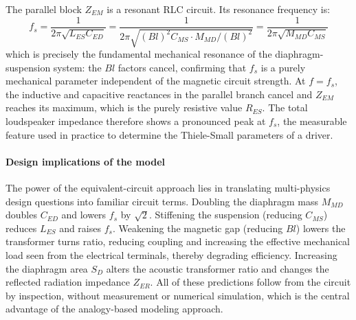 The parallel block \(Z_{EM}\) is a resonant RLC circuit. Its resonance frequency is:
\[
f_s = \frac{1}{2\pi\sqrt{L_{ES} C_{ED}}} = \frac{1}{2\pi\sqrt{(Bl)^2 C_{MS}\cdot M_{MD}/(Bl)^2}} = \frac{1}{2\pi\sqrt{M_{MD} C_{MS}}}
\]
which is precisely the fundamental mechanical resonance of the diaphragm-suspension system: the \(Bl\) factors cancel, confirming that \(f_s\) is a purely mechanical parameter independent of the magnetic circuit strength. At \(f = f_s\), the inductive and capacitive reactances in the parallel branch cancel and \(Z_{EM}\) reaches its maximum, which is the purely resistive value \(R_{ES}\). The total loudspeaker impedance therefore shows a pronounced peak at \(f_s\), the measurable feature used in practice to determine the Thiele-Small parameters of a driver.

\paragraph{Design implications of the model} The power of the equivalent-circuit approach lies in translating multi-physics design questions into familiar circuit terms. Doubling the diaphragm mass \(M_{MD}\) doubles \(C_{ED}\) and lowers \(f_s\) by \(\sqrt{2}\). Stiffening the suspension (reducing \(C_{MS}\)) reduces \(L_{ES}\) and raises \(f_s\). Weakening the magnetic gap (reducing \(Bl\)) lowers the transformer turns ratio, reducing coupling and increasing the effective mechanical load seen from the electrical terminals, thereby degrading efficiency. Increasing the diaphragm area \(S_D\) alters the acoustic transformer ratio and changes the reflected radiation impedance \(Z_{ER}\). All of these predictions follow from the circuit by inspection, without measurement or numerical simulation, which is the central advantage of the analogy-based modeling approach.
